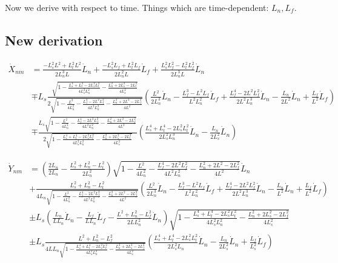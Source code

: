 \documentclass[11pt, landscape]{article}
\begin{document}
Now we derive with respect to time. Things which are time-dependent: $L_n, L_f$.
\subsection{New derivation}
\begin{align}
  \dot{X}_{nm} &= \frac{-L_s^2L^2 + L_t^2L^2}{2L_n^3L}\dot{L}_n + \frac{-L_s^2L_{f} + L_t^2L_{f}}{2L_n^2L}\dot{L}_f + \frac{L_s^2L_{f}^2 - L_t^2L_{f}^2}{2L_n^3L}\dot{L}_n\\
  &\mp L_s\frac{\sqrt{1 - \frac{L_s^4 + L_t^4 - 2L_s^2L_t^2}{4L_{s}^2L_{n}^2} - \frac{L_n^2 + 2L_s^2 - 2L_t^2}{4L_s^2}}}{2\sqrt{1 - \frac{L^2}{4L_n^2} - \frac{L_f^4 - 2L^2L_f^2}{4L^2L_n^2} - \frac{L_n^2 + 2L^2 - 2L_f^2}{4L^2}}}\left(\frac{L^2}{2L_n^3}\dot{L}_n - \frac{L_f^3 - L^2L_f}{L^2L_n^2}\dot{L}_f + \frac{L_f^4 - 2L^2L_f^2}{2L^2L_n^3}\dot{L}_n - \frac{L_n}{2L^2}\dot{L}_n + \frac{L_f}{L^2}\dot{L}_f\right)\\
  &\mp \frac{L_s\sqrt{1 - \frac{L^2}{4L_n^2} - \frac{L_f^4 - 2L^2L_f^2}{4L^2L_n^2} - \frac{L_n^2 + 2L^2 - 2L_f^2}{4L^2}}}{2\sqrt{1 - \frac{L_s^4 + L_t^4 - 2L_s^2L_t^2}{4L_{s}^2L_{n}^2} - \frac{L_n^2 + 2L_s^2 - 2L_t^2}{4L_s^2}}}
  \left(\frac{L_s^4 + L_t^4 - 2L_s^2L_t^2}{2L_{s}^2L_{n}^3}\dot{L}_n - \frac{L_n}{2L_s^2}\dot{L}_n\right)
\end{align}

\begin{align}
  \dot{Y}_{nm} &= \left(\frac{2L_n}{2L_n} - \frac{L_{s}^2+L_{n}^2-L_{t}^2}{2L_n^2}\right)\sqrt{1 - \frac{L^2}{4L_{n}^2} - \frac{L_f^4 - 2L^2L_f^2}{4L^2L^2_{n}} - \frac{L_n^2 + 2L^2 - 2L_f^2}{4L^2}}\dot{L}_n\\
  &+ \frac{L_{s}^2+L_{n}^2-L_{t}^2}{4L_{n}\sqrt{1 - \frac{L^2}{4L_{n}^2} - \frac{L_f^4 - 2L^2L_f^2}{4L^2L^2_{n}} - \frac{L_n^2 + 2L^2 - 2L_f^2}{4L^2}}}\left(\frac{L^2}{2L_n^3}\dot{L}_n - \frac{L_f^3 - L^2L_f}{L^2L^2_{n}}\dot{L}_f + \frac{L_f^4 - 2L^2L_f^2}{2L^2L^3_n}\dot{L}_n - \frac{L_n}{L^2}\dot{L}_n + \frac{L_f}{L^2}\dot{L}_f\right)\\
  &\pm L_s\left(\frac{L_n}{LL_{n}}\dot{L}_n - \frac{L_f}{LL_{n}}\dot{L}_f - \frac{L^2+L_{n}^2-L_{f}^2}{2LL_n^2}\dot{L}_n\right)\sqrt{1 - \frac{L_s^4 + L_t^4 - 2L_s^2L_t^2}{4L_s^2L_n^2} - \frac{L_n^2 + 2L_s^2 - 2L_f^2}{4L_s^2}}\\
  &\pm L_s\frac{L^2+L_{n}^2-L_{f}^2}{4LL_{n}\sqrt{1 - \frac{L_s^4 + L_t^4 - 2L_s^2L_t^2}{4L_s^2L_n^2} - \frac{L_n^2 + 2L_s^2 - 2L_f^2}{4L_s^2}}}\left(\frac{L_s^4 + L_t^4 - 2L_s^2L_t^2}{2L_s^2L_n}\dot{L}_n - \frac{L_n}{2L_s^2}\dot{L}_n + \frac{L_f}{L_s^2}\dot{L}_f\right)
\end{align}
\end{document}
